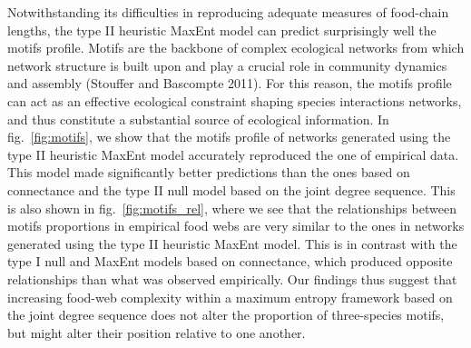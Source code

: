\documentclass[10pt,oneside]{article}
\begin{document}
Notwithstanding its difficulties in reproducing adequate measures of
food-chain lengths, the type II heuristic MaxEnt model can predict
surprisingly well the motifs profile. Motifs are the backbone of complex
ecological networks from which network structure is built upon and play
a crucial role in community dynamics and assembly (Stouffer and
Bascompte 2011). For this reason, the motifs profile can act as an
effective ecological constraint shaping species interactions networks,
and thus constitute a substantial source of ecological information. In
fig.~\ref{fig:motifs}, we show that the motifs profile of networks
generated using the type II heuristic MaxEnt model accurately reproduced
the one of empirical data. This model made significantly better
predictions than the ones based on connectance and the type II null
model based on the joint degree sequence. This is also shown in
fig.~\ref{fig:motifs_rel}, where we see that the relationships between
motifs proportions in empirical food webs are very similar to the ones
in networks generated using the type II heuristic MaxEnt model. This is
in contrast with the type I null and MaxEnt models based on connectance,
which produced opposite relationships than what was observed
empirically. Our findings thus suggest that increasing food-web
complexity within a maximum entropy framework based on the joint degree
sequence does not alter the proportion of three-species motifs, but
might alter their position relative to one another.
\end{document}
